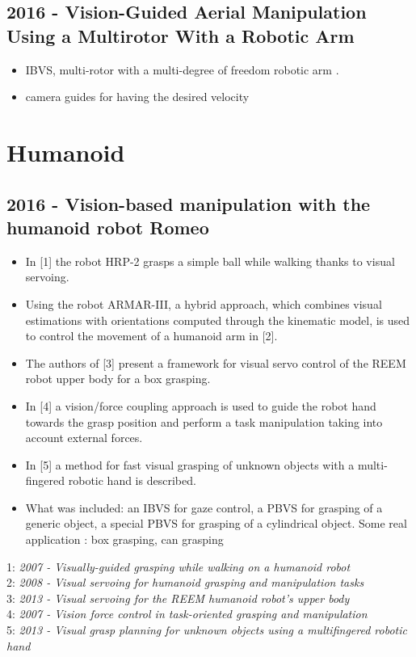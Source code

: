 \subsection{2016 - Vision-Guided Aerial Manipulation Using a Multirotor With a Robotic Arm}
\begin{itemize}
\item IBVS, multi-rotor with a multi-degree of freedom robotic arm . 
\item camera guides for having the desired velocity
\end{itemize}

\section{Humanoid} \label{humanoid}
\subsection{2016 - Vision-based manipulation with the humanoid robot Romeo}
\begin{itemize}
\item In [1] the robot HRP-2 grasps a simple ball while walking thanks to visual servoing.
\item Using the robot ARMAR-III, a hybrid approach, which combines visual estimations with orientations computed through the kinematic model, is used to control the movement of a humanoid arm in [2]. 
\item The authors of [3] present a framework for visual servo
control of the REEM robot upper body for a box grasping.
\item In [4] a vision/force coupling approach is used to guide the robot hand towards the grasp position and perform a task manipulation taking into account external forces.
\item In [5] a method for fast visual grasping of unknown objects with a multi-fingered robotic hand is described.
\item  What was included: an IBVS for gaze control, a PBVS for grasping of a generic object, a special PBVS for grasping of a cylindrical object. Some real application : box grasping, can grasping
\end{itemize}
1: \textit{2007 - Visually-guided grasping while walking on a humanoid robot} \\
2: \textit{2008 - Visual servoing for humanoid grasping and manipulation tasks} \\
3: \textit{2013 - Visual servoing for the REEM humanoid robot’s upper body} \\
4: \textit{2007 - Vision force control in task-oriented grasping and manipulation} \\
5: \textit{2013 - Visual grasp planning for unknown objects using a multifingered robotic hand}

